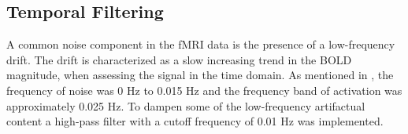 \subsection{Temporal Filtering}

A common noise component in the fMRI data is the presence of a low-frequency drift. The drift is characterized as a slow increasing trend in the BOLD magnitude, when assessing the signal in the time domain. As mentioned in , the frequency of noise was 0 Hz to 0.015 Hz and the frequency band of activation was approximately 0.025 Hz. To dampen some of the low-frequency artifactual content a high-pass filter with a cutoff frequency of 0.01 Hz was implemented. \cite{FMRIB2018} \\


 
 
 
 
 
